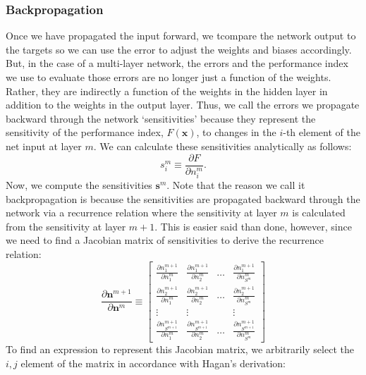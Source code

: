 \documentclass[12pt,halfline,a4paper]{ouparticle}
\begin{document}
\subsubsection{Backpropagation}
\label{sec4.2.3}
Once we have propagated the input forward, we tcompare the network output to the targets so we can use the error to adjust the weights and biases accordingly. But, in the case of a multi-layer network, the errors and the performance index we use to evaluate those errors are no longer just a function of the weights. Rather, they are indirectly a function of the weights in the hidden layer in addition to the weights in the output layer. Thus, we call the errors we propagate backward through the network `sensitivities' because they represent the sensitivity of the performance index, $F(\mathbf{x})$, to changes in the $i$-th element of the net input at layer $m$. We can calculate these sensitivities analytically as follows: 
\begin{equation}
s^{m}_{i} \equiv \frac{\partial F}{\partial n^{m}_{i}}. 
\end{equation}
Now, we compute the sensitivities $\mathbf{s}^{m}$. Note that the reason we call it backpropagation is because the sensitivities are propagated backward through the network via a recurrence relation where the sensitivity at layer $m$ is calculated from the sensitivity at layer $m+1$. This is easier said than done, however, since we need to find a Jacobian matrix of sensitivities to derive the recurrence relation: 
\begin{equation}
\frac{\partial \mathbf{n}^{m+1}}{\partial \mathbf{n}^{m}} \equiv \begin{bmatrix} 
\frac{\partial n^{m+1}_{1}}{\partial n^{m}_{1}} &  \frac{\partial n^{m+1}_{1}}{\partial n^{m}_{2}} & \dots &  \frac{\partial n^{m+1}_{1}}{\partial n^{m}_{S^{m}}} \\
\frac{\partial n^{m+1}_{2}}{\partial n^{m}_{1}} &  \frac{\partial n^{m+1}_{2}}{\partial n^{m}_{2}} & \dots & \frac{\partial n^{m+1}_{2}}{\partial n^{m}_{S^{m}}} \\
\vdots & \vdots &  & \vdots \\
\frac{\partial n^{m+1}_{S^{m+1}}}{\partial n^{m}_{1}} &  \frac{\partial n^{m+1}_{S^{m+1}}}{\partial n^{m}_{2}} & \dots & \frac{\partial n^{m+1}_{S^{m+1}}}{\partial n^{m}_{S^{m}}}
\end{bmatrix}
\end{equation}
To find an expression to represent this Jacobian matrix, we arbitrarily select the $i, j$ element of the matrix in accordance with Hagan's derivation: 
\end{document}
